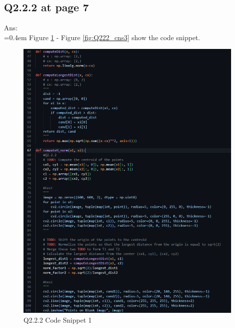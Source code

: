 \documentclass{article}
\begin{document}
	\newpage
	\subsection*{Q2.2.2 at page 7}
	Ans:\\
	\hangindent=0.4em \hspace{0.3em} Figure \ref{fig:Q222_cns1} - Figure \ref{fig:Q222_cns3} show the code snippet.
	\begin{figure}[H]
	\centering
	\begin{minipage}[b]{0.45\textwidth}
		\centering
		\includegraphics[width=\textwidth]{Q2_2_2_cns1.png}  %
		\caption{Q2.2.2 Code Snippet 1}
		\label{fig:Q222_cns1}
	\end{minipage}
	\hfill  %
	\begin{minipage}[b]{0.45\textwidth}
		\centering

\end{minipage}
\end{figure}
\end{document}
